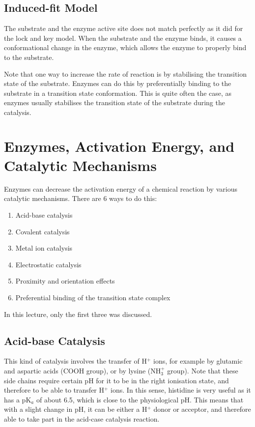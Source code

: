 \documentclass[a4paper, 12pt]{report}
\begin{document}
\subsection{Induced-fit Model}

The substrate and the enzyme active site does not match perfectly as it did for the lock and key model.
When the substrate and the enzyme binds, it causes a conformational change in the enzyme, which allows the enzyme to properly bind to the substrate.

Note that one way to increase the rate of reaction is by stabilising the transition state of the substrate.
Enzymes can do this by preferentially binding to the substrate in a transition state conformation.
This is quite often the case, as enzymes usually stabilises the transition state of the substrate during the catalysis.

\section{Enzymes, Activation Energy, and \\Catalytic Mechanisms}

Enzymes can decrease the activation energy of a chemical reaction by various catalytic mechanisms.
There are 6 ways to do this:

\begin{enumerate}
\item Acid-base catalysis
\item Covalent catalysis
\item Metal ion catalysis
\item Electrostatic catalysis
\item Proximity and orientation effects
\item Preferential binding of the transition state complex
\end{enumerate}

In this lecture, only the first three was discussed.

\subsection{Acid-base Catalysis}

This kind of catalysis involves the transfer of H$^+$ ions, for example by glutamic and aspartic acids (COOH group), or by lysine (NH$_3^+$ group).
Note that these side chains require certain pH for it to be in the right ionisation state, and therefore to be able to transfer H$^+$ ions.
In this sense, histidine is very useful as it has a pK$_a$ of about 6.5, which is close to the physiological pH.
This means that with a slight change in pH, it can be either a H$^+$ donor or acceptor, and therefore able to take part in the acid-case catalysis reaction.
\end{document}
